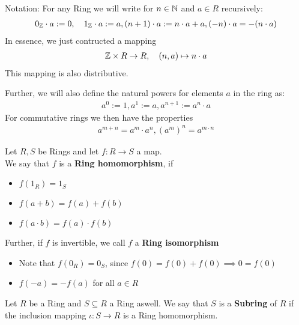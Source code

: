 Notation: For any Ring we will write for $n \in \mathbb{N}$ and $a \in R$ recursively:
\begin{align*}
				0_{\mathbb{Z}} \cdot a := 0, \quad 1_{\mathbb{Z}} \cdot a := a, (n+1) \cdot a := n \cdot a + a, (-n) \cdot a = -(n \cdot a) 
\end{align*}
In essence, we just contructed a mapping
\begin{align*}
				\mathbb{Z} \times R \to R, \quad (n,a) \mapsto n \cdot a
\end{align*}
This mapping is also distributive.

Further, we will also define the natural powers for elements $a$ in the ring as:
\begin{align*}
	a^0 := 1, a^1 := a, a^{n+1} := a^n \cdot a
\end{align*}
For commutative rings we then have the properties
\begin{align*}
				a^{m+n} = a^m \cdot a^n, {(a^m)}^n = a^{m \cdot n}
\end{align*}


\begin{definition}[]
	Let $R,S$ be Rings and let $f: R \to S$ a map.\\
	We say that $f$ is a \textbf{Ring homomorphism}, if
	\begin{itemize}
					\item $f(1_R) = 1_S$
					\item $f(a+b) = f(a) + f(b)$
					\item $f(a \cdot b) = f(a) \cdot f(b)$
	\end{itemize}
Further, if $f$ is invertible, we call $f$ a \textbf{Ring isomorphism}
\end{definition}

\begin{itemize}
				\item Note that $f(0_R) = 0_S$, since $f(0) = f(0) + f(0) \implies 0 = f(0)$
				\item $f(-a) = -f(a)$ for all $a \in R$
\end{itemize}



\begin{definition}[]
	Let $R$ be a Ring and $S \subseteq R$ a Ring aswell. We say that $S$ is a \textbf{Subring} of $R$ if the inclusion mapping $\iota: S \to R$ is a Ring homomorphism.
\end{definition}


